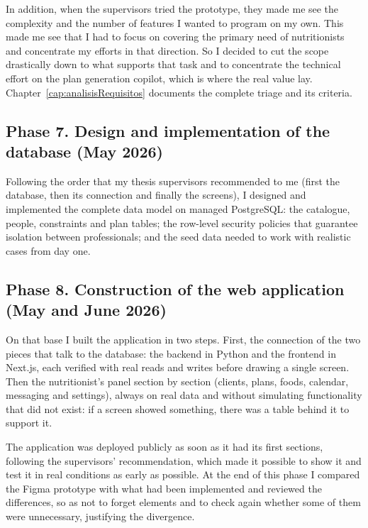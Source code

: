 In addition, when the supervisors tried the prototype, they made me see the complexity and the number of features I wanted to program on my own. This made me see that I had to focus on covering the primary need of nutritionists and concentrate my efforts in that direction. So I decided to cut the scope drastically down to what supports that task and to concentrate the technical effort on the plan generation copilot, which is where the real value lay. Chapter~\ref{cap:analisisRequisitos} documents the complete triage and its criteria.

\subsection*{Phase 7. Design and implementation of the database (May 2026)}

Following the order that my thesis supervisors recommended to me (first the database, then its connection and finally the screens), I designed and implemented the complete data model on managed PostgreSQL: the catalogue, people, constraints and plan tables; the row-level security policies that guarantee isolation between professionals; and the seed data needed to work with realistic cases from day one.

\subsection*{Phase 8. Construction of the web application (May and June 2026)}

On that base I built the application in two steps. First, the connection of the two pieces that talk to the database: the backend in Python and the frontend in Next.js, each verified with real reads and writes before drawing a single screen. Then the nutritionist's panel section by section (clients, plans, foods, calendar, messaging and settings), always on real data and without simulating functionality that did not exist: if a screen showed something, there was a table behind it to support it.

The application was deployed publicly as soon as it had its first sections, following the supervisors' recommendation, which made it possible to show it and test it in real conditions as early as possible. At the end of this phase I compared the Figma prototype with what had been implemented and reviewed the differences, so as not to forget elements and to check again whether some of them were unnecessary, justifying the divergence.

